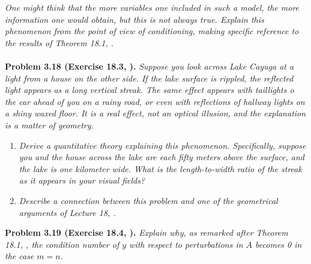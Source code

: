 \documentclass[a4paper,oneside]{book}
\numberwithin{equation}{chapter}
\begin{document}
\textit{One might think that the more variables one included in such a model, the more information one would obtain, but this is not always true. Explain this phenomenon from the point of view of conditioning, making specific reference to the results of Theorem 18.1, \cite{1}.}\\
\\
\textbf{Problem 3.18 (Exercise 18.3, \cite{1}).} \textit{Suppose you look across Lake Cayuga at a light from a house on the other side. If the lake surface is rippled, the reflected light appears as a long vertical streak. The same effect appears with taillights o the car ahead of you on a rainy road, or even with reflections of hallway lights on a shiny waxed floor. It is a real effect, not an optical illusion, and the explanation is a matter of geometry.}
\begin{enumerate}
\item \textit{Derive a quantitative theory explaining this phenomenon. Specifically, suppose you and the house across the lake are each fifty meters above the surface, and the lake is one kilometer wide. What is the length-to-width ratio of the streak as it appears in your visual fields?}
\item \textit{Describe a connection between this problem and one of the geometrical arguments of Lecture 18, \cite{1}.}
\end{enumerate}
\textbf{Problem 3.19 (Exercise 18.4, \cite{1}).} \textit{Explain why, as remarked after Theorem 18.1, \cite{1}, the condition number of $y$ with respect to perturbations in $A$ becomes 0 in the case $m=n$.}
\end{document}
